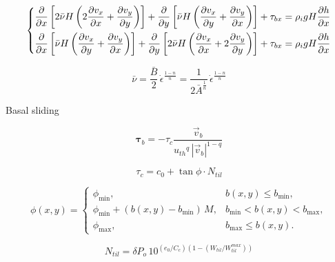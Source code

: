 \documentclass{article}
\begin{document}
\begin{equation}
    \left\{\begin{aligned}
        \pdv{x} \left[2\bar{\nu}H
                      \left(2\pdv{v_x}{x} + \pdv{v_y}{y}\right) \right]
            + \pdv{y} \left[\bar{\nu}H
                            \left(\pdv{v_x}{y} + \pdv{v_y}{x}\right) \right]
            + \tau_{bx} &= \rho_i gH \pdv{h}{x} \\
        \pdv{x} \left[\bar{\nu}H
                      \left(\pdv{v_x}{y} + \pdv{v_y}{x}\right) \right]
            + \pdv{y} \left[2\bar{\nu}H
                            \left(\pdv{v_x}{x} + 2\pdv{v_y}{y}\right) \right]
            + \tau_{bx} &= \rho_i gH \pdv{h}{x} \\
    \end{aligned}\right.
\end{equation}

\begin{equation}
    \bar{\nu} = \frac{\bar{B}}{2}\,\dot{\epsilon}^{\frac{1-n}{n}}
              = \frac{1}{2 \bar{A}^{\frac{1}{n}}}\,
                \dot{\epsilon}^{\frac{1-n}{n}}
\end{equation}

Basal sliding

\begin{equation}
    \bm{\tau}_b = -\tau_c \frac{\vec{v}_b}
                               {{u_{th}}^q\,|\vec{v}_b|^{1-q}}
\end{equation}

\begin{equation}
   \tau_c = c_{0} + \tan{\phi}\cdot N_{til}
\end{equation}

\newcommand{\phimin}{\phi_{\mathrm{min}}}
\newcommand{\phimax}{\phi_{\mathrm{max}}}
\newcommand{\bmin}{b_{\mathrm{min}}}
\newcommand{\bmax}{b_{\mathrm{max}}}

\begin{equation}
  \phi(x,y) =
  \begin{cases}
    \phimin, & b(x,y) \le \bmin, \\
    \phimin + (b(x,y) - \bmin) \,M, & \bmin < b(x,y) < \bmax, \\
    \phimax, & \bmax \le b(x,y).
  \end{cases}
  \label{eq:phipiecewise}
\end{equation}

\begin{equation}
N_{til} = \delta P_o \, 10^{(e_0/C_c)
          \left(1 - (W_{til}/W_{til}^{max})\right)}
\end{equation}
\end{document}

